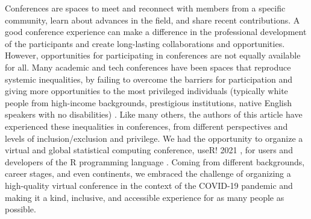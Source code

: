 \documentclass[10pt,letterpaper]{article}
\begin{document}
Conferences are spaces to meet and reconnect with members from a specific community, learn about advances in the field, and share recent contributions.
A good conference experience can make a difference in the professional development of the participants and create long-lasting collaborations and opportunities. 
However, opportunities for participating in conferences are not equally available for all. 
Many academic and tech conferences have been spaces that reproduce systemic inequalities, by failing to overcome the barriers for participation and giving more opportunities to the most privileged individuals (typically white people from high-income backgrounds, prestigious institutions,  native English speakers with no disabilities) \cite{arendDisparityConferenceRegistration2019, biggsAcademicConferenceChilly2018, depickerRethinkingInclusionDisability2020a, irishIncreasingParticipationUsing2020}.
Like many others, the authors of this article have experienced these inequalities in conferences, from different perspectives and levels of inclusion/exclusion and privilege. 
We had the opportunity to organize a virtual and global statistical computing conference, useR! 2021 \cite{sanchez-tapia_user_2021-2}, for users and developers of the R programming language \cite{r_core_team_2021}.
Coming from different backgrounds, career stages, and even continents, we embraced the challenge of organizing a high-quality virtual conference in the context of the COVID-19 pandemic and making it a kind, inclusive, and accessible experience for as many people as possible.
\end{document}
